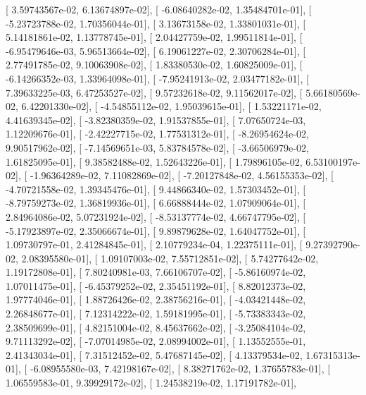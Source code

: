 \documentclass{article}
\begin{document}
       [  3.59743567e-02,   6.13674897e-02],
       [ -6.08640282e-02,   1.35484701e-01],
       [ -5.23723788e-02,   1.70356044e-01],
       [  3.13673158e-02,   1.33801031e-01],
       [  5.14181861e-02,   1.13778745e-01],
       [  2.04427759e-02,   1.99511814e-01],
       [ -6.95479646e-03,   5.96513664e-02],
       [  6.19061227e-02,   2.30706284e-01],
       [  2.77491785e-02,   9.10063908e-02],
       [  1.83380530e-02,   1.60825009e-01],
       [ -6.14266352e-03,   1.33964098e-01],
       [ -7.95241913e-02,   2.03477182e-01],
       [  7.39633225e-03,   6.47253527e-02],
       [  9.57232618e-02,   9.11562017e-02],
       [  5.66180569e-02,   6.42201330e-02],
       [ -4.54855112e-02,   1.95039615e-01],
       [  1.53221171e-02,   4.41639345e-02],
       [ -3.82380359e-02,   1.91537855e-01],
       [  7.07650724e-03,   1.12209676e-01],
       [ -2.42227715e-02,   1.77531312e-01],
       [ -8.26954624e-02,   9.90517962e-02],
       [ -7.14569651e-03,   5.83784578e-02],
       [ -3.66506979e-02,   1.61825095e-01],
       [  9.38582488e-02,   1.52643226e-01],
       [  1.79896105e-02,   6.53100197e-02],
       [ -1.96364289e-02,   7.11082869e-02],
       [ -7.20127848e-02,   4.56155353e-02],
       [ -4.70721558e-02,   1.39345476e-01],
       [  9.44866340e-02,   1.57303452e-01],
       [ -8.79759273e-02,   1.36819936e-01],
       [  6.66888444e-02,   1.07909064e-01],
       [  2.84964086e-02,   5.07231924e-02],
       [ -8.53137774e-02,   4.66747795e-02],
       [ -5.17923897e-02,   2.35066674e-01],
       [  9.89879628e-02,   1.64047752e-01],
       [  1.09730797e-01,   2.41284845e-01],
       [  2.10779234e-04,   1.22375111e-01],
       [  9.27392790e-02,   2.08395580e-01],
       [  1.09107003e-02,   7.55712851e-02],
       [  5.74277642e-02,   1.19172808e-01],
       [  7.80240981e-03,   7.66106707e-02],
       [ -5.86160974e-02,   1.07011475e-01],
       [ -6.45379252e-02,   2.35451192e-01],
       [  8.82012373e-02,   1.97774046e-01],
       [  1.88726426e-02,   2.38756216e-01],
       [ -4.03421448e-02,   2.26848677e-01],
       [  7.12314222e-02,   1.59181995e-01],
       [ -5.73383343e-02,   2.38509699e-01],
       [  4.82151004e-02,   8.45637662e-02],
       [ -3.25084104e-02,   9.71113292e-02],
       [ -7.07014985e-02,   2.08994002e-01],
       [  1.13552555e-01,   2.41343034e-01],
       [  7.31512452e-02,   5.47687145e-02],
       [  4.13379534e-02,   1.67315313e-01],
       [ -6.08955580e-03,   7.42198167e-02],
       [  8.38271762e-02,   1.37655783e-01],
       [  1.06559583e-01,   9.39929172e-02],
       [  1.24538219e-02,   1.17191782e-01],
\end{document}
